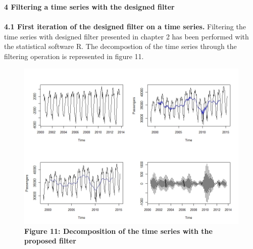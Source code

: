 \documentclass{article}
\begin{document}
\textbf{4 Filtering a time series with the designed filter}\\
\bigskip\\
\textbf{\small 4.1 First iteration of the designed filter on a time series.}
Filtering the time series with designed filter presented in chapter 2 has been performed with the statistical software R. The decompostion of the time series through the filtering operation is represented in figure 11.
\begin{figure}[H]
  \includegraphics[width=\textwidth]{../images/capitolo4/collage.jpeg}
  \centering
  {\textbf{\scriptsize Figure 11: Decomposition of the time series with the proposed filter}}
\end{figure}
\end{document}
